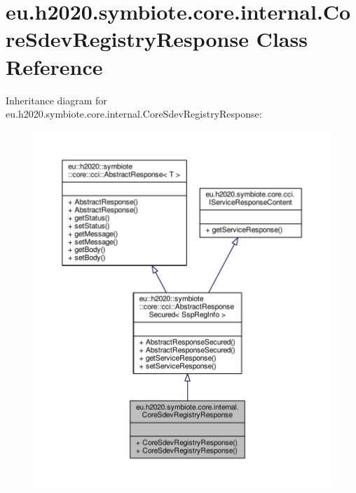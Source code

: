\hypertarget{classeu_1_1h2020_1_1symbiote_1_1core_1_1internal_1_1CoreSdevRegistryResponse}{}\section{eu.\+h2020.\+symbiote.\+core.\+internal.\+Core\+Sdev\+Registry\+Response Class Reference}
\label{classeu_1_1h2020_1_1symbiote_1_1core_1_1internal_1_1CoreSdevRegistryResponse}


Inheritance diagram for eu.\+h2020.\+symbiote.\+core.\+internal.\+Core\+Sdev\+Registry\+Response\+:
\nopagebreak
\begin{figure}[H]
\begin{center}
\leavevmode
\includegraphics[width=350pt]{classeu_1_1h2020_1_1symbiote_1_1core_1_1internal_1_1CoreSdevRegistryResponse__inherit__graph}
\end{center}
\end{figure}


